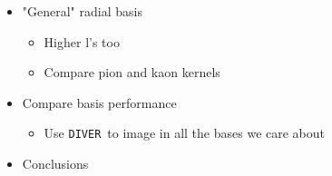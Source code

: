 \documentclass[aps,prl,twocolumn,floatfix,preprintnumbers,showpacs]{revtex4}
\newcommand{\CHUM}{{\tt CHUM}}
\newcommand{\DIVER}{{\tt DIVER}}
\begin{document}
\begin{itemize}
    \item "General" radial basis
    \begin{itemize}
         \item Higher l's too
         \item Compare pion and kaon kernels 
    \end{itemize}
    \item Compare basis performance
    \begin{itemize}
         \item Use \DIVER\ to image in all the bases we care about 
    \end{itemize}
    \item Conclusions 
\end{itemize}
    
\end{document}
